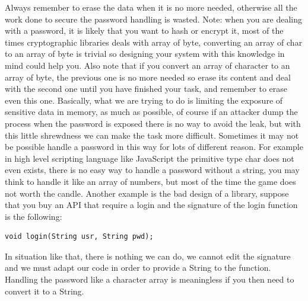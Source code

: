 Always remember to erase the data when it is no more needed, otherwise all the work done to secure the password handling is wasted.\newline
Note: when you are dealing with a password, it is likely that you want to hash or encrypt it, most of the times cryptographic libraries deals with array of byte, converting an array of char to an array of byte is trivial so designing your system with this knowledge in mind could help you.\newline
Also note that if you convert an array of character to an array of byte, the previous one is no more needed so erase its content and deal with the second one until you have finished your task, and remember to erase even this one.\newline
Basically, what we are trying to do is limiting the exposure of sensitive data in memory, as much as possible, of course if an attacker dump the process when the password is exposed there is no way to avoid the leak, but with this little shrewdness we can make the task more difficult.\newline
Sometimes it may not be possible handle a password in this way for lots of different reason.\newline
For example in high level scripting language like JavaScript the primitive type char does not even exists, there is no easy way to handle a password without a string, you may think to handle it like an array of numbers, but most of the time the game does not worth the candle.\newline
Another example is the bad design of a library, suppose that you buy an API that require a login and the signature of the login function is the following:
\begin{lstlisting}
void login(String usr, String pwd);
\end{lstlisting}

In situation like that, there is nothing we can do, we cannot edit the signature and we must adapt our code in order to provide a String to the function.\newline
Handling the password like a character array is meaningless if you then need to convert it to a String.\newline

